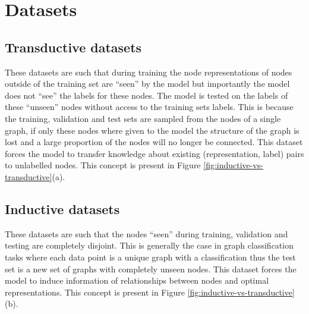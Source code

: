 \chapter{Datasets}
\label{app:datasets}


\section{Transductive datasets}
These datasets are such that during training the node representations of nodes outside of the training set are ``seen'' by the model but importantly the model does not ``see'' the labels for these nodes.
The model is tested on the labels of these ``unseen'' nodes without access to the training sets labels.
This is because the training, validation and test sets are sampled from the nodes of a single graph, if only these nodes where given to the model the structure of the graph is lost and a large proportion of the nodes will no longer be connected.
This dataset forces the model to transfer knowledge about existing (representation, label) pairs to unlabelled nodes.
This concept is present in Figure \ref{fig:inductive-vs-transductive}(a).

\section{Inductive datasets}
These datasets are such that the nodes ``seen'' during training, validation and testing are completely disjoint.
This is generally the case in graph classification tasks where each data point is a unique graph with a classification thus the test set is a new set of graphs with completely unseen nodes.
This dataset forces the model to induce information of relationships between nodes and optimal representations.
This concept is present in Figure \ref{fig:inductive-vs-transductive}(b).

